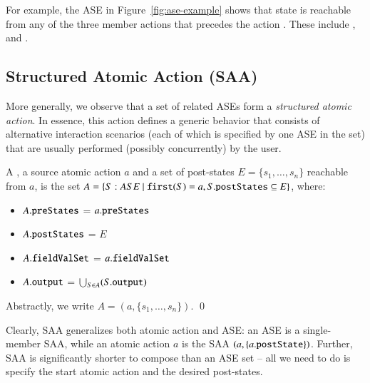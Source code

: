 For example, the ASE in Figure~\ref{fig:ase-example} shows that state  is reachable from any of the three member actions that precedes the action . These include ,  and . 

\subsection{Structured Atomic Action (SAA)} \label{sect:arch-saa}

More generally, we observe that a set of related ASEs form a \textit{structured atomic action}. In essence, this action defines a generic behavior that consists of alternative interaction scenarios (each of which is specified by one ASE in the set) that are usually performed (possibly concurrently) by the user.
%
\begin{definition} \label{def:saa}
	A , \wrt a source atomic action $ a $ and a set of post-states $ E = \{ s_{1},\dots,s_{n} \} $ reachable from $a$, is the set $ A = \{S: ASE ~|~ \func{first}(S) = a, S.\attribn{postStates} \subseteq E \} $, where:
  \begin{itemize}
  \item $A.{\tt preStates}$ = $a.{\tt preStates}$
  \item $A.{\tt postStates}$ = $E$
  \item $A.{\tt fieldValSet}$ = $a.{\tt fieldValSet}$
  \item $A.{\tt output}$ = $\bigcup_{S \in A} (S.{\tt output})$
  \end{itemize}

  Abstractly, we write $ A = (a, \{ s_{1},\dots,s_{n} \}) $. \qed
\end{definition}

Clearly, SAA generalizes both atomic action and ASE: an ASE is a single-member SAA, while an atomic action $ a $ is the SAA 
%
$ (a, \{ a.{\tt postState} \}) $.
%
Further, SAA is significantly shorter to compose than an ASE set -- all we need to do is specify the start atomic action and the desired post-states. 

